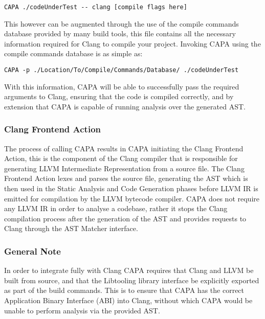 \lstinline{CAPA ./codeUnderTest -- clang [compile flags here]}

This however can be augmented through the use of the compile commands database provided by many
build tools, this file contains all the necessary information required for Clang to compile your
project. Invoking CAPA using the compile commands database is as simple as:

\lstinline{CAPA -p ./Location/To/Compile/Commands/Database/ ./codeUnderTest }

With this information, CAPA will be able to successfully pass the required arguments to Clang,
ensuring that the code is compiled correctly, and by extension that CAPA is capable of running
analysis over the generated AST.

\subsubsection{Clang Frontend Action}
The process of calling CAPA results in CAPA initiating the Clang Frontend Action, this is the
component of the Clang compiler that is responsible for generating LLVM Intermediate Representation
from a source file. The Clang Frontend Action lexes and parses the source file, generating the AST
which is then used in the Static Analysis and Code Generation phases before LLVM IR is emitted for
compilation by the LLVM bytecode compiler. CAPA does not require any LLVM IR in order to analyse a
codebase, rather it stops the Clang compilation process after the generation of the AST and provides
requests to Clang through the AST Matcher interface.

\subsubsection{General Note}
In order to integrate fully with Clang CAPA requires that Clang and LLVM be built from source, and
that the Libtooling library interface be explicitly exported as part of the build commands. This is
to ensure that CAPA has the correct Application Binary Interface (ABI) into Clang, without which
CAPA would be unable to perform analysis via the provided AST.





